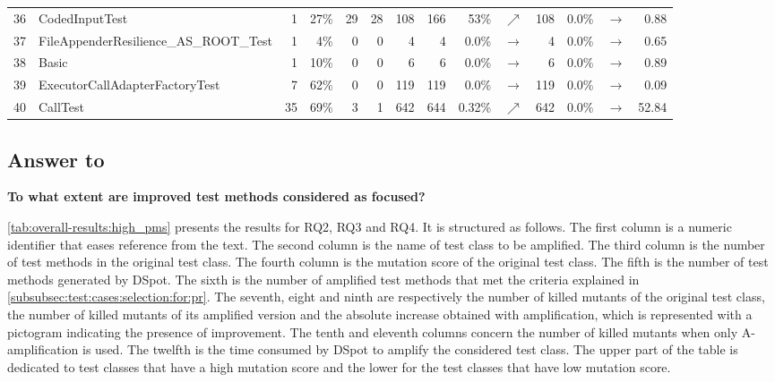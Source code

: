 \documentclass[table,xcdraw,smallextended]{svjour3}
\newcommand{\dspot}{DSpot\xspace}
\newcommand{\ms}{mutation score\xspace}
\newcommand{\ams}{number of killed mutants\xspace}
\begin{document}
\begin{table}
\begin{tabular}{|llrrrr|rrrr|rrr|r|}
\rowcolor[HTML]{EFEFEF}
36&\scriptsize{CodedInputTest}&1&27\%&29&28&108&166&53\%&{\color{ForestGreen}$\nearrow$}&108&0.0\%&$\rightarrow$&0.88 \\
37&\scriptsize{FileAppenderResilience\_AS\_ROOT\_Test}&1&4\%&0&0&4&4&0.0\%&$\rightarrow$&4&0.0\%&$\rightarrow$&0.65 \\
\rowcolor[HTML]{EFEFEF}
38&\scriptsize{Basic}&1&10\%&0&0&6&6&0.0\%&$\rightarrow$&6&0.0\%&$\rightarrow$&0.89 \\
39&\scriptsize{ExecutorCallAdapterFactoryTest}&7&62\%&0&0&119&119&0.0\%&$\rightarrow$&119&0.0\%&$\rightarrow$&0.09 \\
\rowcolor[HTML]{EFEFEF}
40&\scriptsize{CallTest}&35&69\%&3&1&642&644&0.32\%&{\color{ForestGreen}$\nearrow$}&642&0.0\%&$\rightarrow$&52.84 \\
\hline
\end{tabular}
\end{table}


\subsection{Answer to \rqcandidates{}}

\textbf{\rqcandidates{} To what extent are improved test methods considered as focused?}

\autoref{tab:overall-results:high_pms}
presents the results for RQ2, RQ3 and RQ4.%
It is structured as follows.
The first column is a numeric identifier that eases reference from the text.
The second column is the name of test class to be amplified.
The third column is the number of test methods in the original test class.
The fourth column is the \ms of the original test class.
The fifth is the number of test methods generated by \dspot.
The sixth is the number of amplified test methods that met the criteria explained in \autoref{subsubsec:test:cases:selection:for:pr}.
The seventh, eight and ninth are respectively the \ams of the original test class, the \ams of its amplified version and the absolute increase obtained with amplification, which is represented with a pictogram indicating the presence of improvement. 
The tenth and eleventh columns concern the \ams when only A-amplification is used.
The twelfth is the time consumed by \dspot to amplify the considered test class. 
The upper part of the table is dedicated to test classes that have a high \ms and the lower for the test classes that have low \ms.
\end{document}
